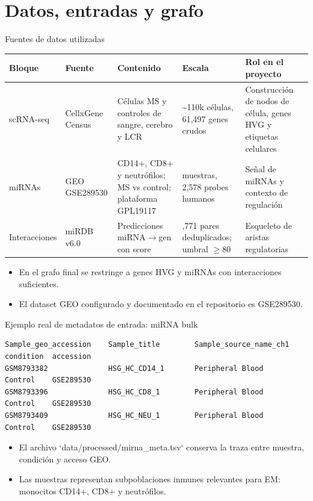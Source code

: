 \section{Datos, entradas y grafo}

\begin{frame}{Fuentes de datos utilizadas}
  \scriptsize
  \begin{tabularx}{\textwidth}{>{\raggedright\arraybackslash}p{2.1cm} >{\raggedright\arraybackslash}p{2.7cm} >{\raggedright\arraybackslash}p{4.2cm} >{\raggedright\arraybackslash}p{2.2cm} >{\raggedright\arraybackslash}X}
    \toprule
    \textbf{Bloque} & \textbf{Fuente} & \textbf{Contenido} & \textbf{Escala} & \textbf{Rol en el proyecto} \\
    \midrule
    scRNA-seq & CellxGene Census & C\'elulas MS y controles de sangre, cerebro y LCR & \textasciitilde 110k c\'elulas, 61,497 genes crudos & Construcci\'on de nodos de c\'elula, genes HVG y etiquetas celulares \\
    miRNAs & GEO GSE289530 & CD14+, CD8+ y neutr\'ofilos; MS vs control; plataforma GPL19117 & 166 muestras, 2,578 probes humanos & Se\~nal de miRNAs y contexto de regulaci\'on \\
    Interacciones & miRDB v6.0 & Predicciones miRNA$\rightarrow$gen con score & 412,771 pares deduplicados; umbral $\geq 80$ & Esqueleto de aristas regulatorias \\
    \bottomrule
  \end{tabularx}

  \vspace{0.6em}
  \normalsize
  \begin{itemize}
    \item En el grafo final se restringe a genes HVG y miRNAs con interacciones suficientes.
    \item El dataset GEO configurado y documentado en el repositorio es GSE289530.
  \end{itemize}
\end{frame}

\begin{frame}[fragile]{Ejemplo real de metadatos de entrada: miRNA bulk}
  \scriptsize
  \begin{lstlisting}
Sample_geo_accession    Sample_title        Sample_source_name_ch1  condition  accession
GSM8793382              HSG_HC_CD14_1       Peripheral Blood       Control    GSE289530
GSM8793396              HSG_HC_CD8_1        Peripheral Blood       Control    GSE289530
GSM8793409              HSG_HC_NEU_1        Peripheral Blood       Control    GSE289530
  \end{lstlisting}

  \vspace{0.3em}
  \begin{itemize}
    \item El archivo `data/processed/mirna_meta.tsv` conserva la traza entre muestra, condici\'on y acceso GEO.
    \item Las muestras representan subpoblaciones inmunes relevantes para EM: monocitos CD14+, CD8+ y neutr\'ofilos.
  \end{itemize}
\end{frame}

